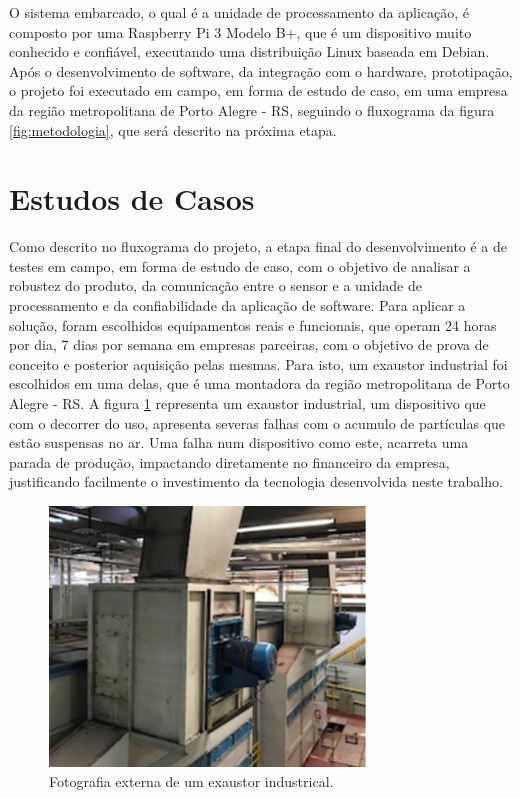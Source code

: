 O sistema embarcado, o qual é a unidade de processamento da aplicação, é composto por uma Raspberry Pi 3 Modelo B+, que é um dispositivo muito 
conhecido e confiável, executando uma distribuição Linux baseada em Debian. Após o desenvolvimento de software, da integração com o hardware, 
prototipação, o projeto foi executado em campo, em forma de estudo de caso, em uma empresa da região metropolitana de Porto Alegre - RS, seguindo o fluxograma da 
figura \ref{fig:metodologia}, que será descrito na próxima etapa.

% 

\section{Estudos de Casos}


Como descrito no fluxograma do projeto, a etapa final do desenvolvimento é a de testes em campo, em forma de estudo de caso, com o objetivo 
de analisar a robustez do produto, da comunicação entre o sensor e a unidade de processamento e da confiabilidade da aplicação de software. 
Para aplicar a solução, foram escolhidos equipamentos reais e funcionais, que operam 24 horas por dia, 7 dias por semana em empresas parceiras,
com o objetivo de prova de conceito e posterior aquisição pelas mesmas. Para isto, um exaustor industrial foi escolhidos em uma delas, que é 
uma montadora da região metropolitana de Porto Alegre - RS. A figura \ref{fig:exautor} representa um exaustor industrial, um dispositivo que com o decorrer do uso, apresenta severas falhas com o acumulo 
de partículas que estão suspensas no ar. Uma falha num dispositivo como este, acarreta uma parada de  produção, impactando diretamente no 
financeiro da empresa, justificando facilmente o investimento da tecnologia desenvolvida neste trabalho.

\begin{figure}[H]
    \caption{Fotografia externa de um exaustor industrical.}
    \begin{center}
        \includegraphics[scale=1.25]{metodologia/img/exaustor.png}
    \end{center}
    \label{fig:exautor}
\end{figure}

